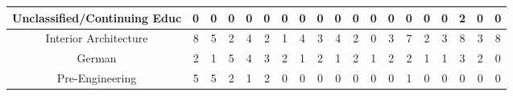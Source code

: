 \documentclass[10pt]{article}
\begin{document}
\begin{landscape}
\begin{longtable}[c]{|ccccccccccccccccccc|}
	\multicolumn{1}{|c|}{Unclassified/Continuing Educ}               & \multicolumn{1}{c|}{0}          & \multicolumn{1}{c|}{0}          & \multicolumn{1}{c|}{0}          & \multicolumn{1}{c|}{0}          & \multicolumn{1}{c|}{0}          & \multicolumn{1}{c|}{0}          & \multicolumn{1}{c|}{0}          & \multicolumn{1}{c|}{0}          & \multicolumn{1}{c|}{0}          & \multicolumn{1}{c|}{0}          & \multicolumn{1}{c|}{0}          & \multicolumn{1}{c|}{0}          & \multicolumn{1}{c|}{0}          & \multicolumn{1}{c|}{0}          & \multicolumn{1}{c|}{0}          & \multicolumn{1}{c|}{2}          & \multicolumn{1}{c|}{0}          & 0          \\ \hline
	\multicolumn{1}{|c|}{Interior Architecture}                      & \multicolumn{1}{c|}{8}          & \multicolumn{1}{c|}{5}          & \multicolumn{1}{c|}{2}          & \multicolumn{1}{c|}{4}          & \multicolumn{1}{c|}{2}          & \multicolumn{1}{c|}{1}          & \multicolumn{1}{c|}{4}          & \multicolumn{1}{c|}{3}          & \multicolumn{1}{c|}{4}          & \multicolumn{1}{c|}{2}          & \multicolumn{1}{c|}{0}          & \multicolumn{1}{c|}{3}          & \multicolumn{1}{c|}{7}          & \multicolumn{1}{c|}{2}          & \multicolumn{1}{c|}{3}          & \multicolumn{1}{c|}{8}          & \multicolumn{1}{c|}{3}          & 8          \\ \hline
	\multicolumn{1}{|c|}{German}                                     & \multicolumn{1}{c|}{2}          & \multicolumn{1}{c|}{1}          & \multicolumn{1}{c|}{5}          & \multicolumn{1}{c|}{4}          & \multicolumn{1}{c|}{3}          & \multicolumn{1}{c|}{2}          & \multicolumn{1}{c|}{1}          & \multicolumn{1}{c|}{2}          & \multicolumn{1}{c|}{1}          & \multicolumn{1}{c|}{2}          & \multicolumn{1}{c|}{1}          & \multicolumn{1}{c|}{2}          & \multicolumn{1}{c|}{2}          & \multicolumn{1}{c|}{1}          & \multicolumn{1}{c|}{1}          & \multicolumn{1}{c|}{3}          & \multicolumn{1}{c|}{2}          & 0          \\ \hline
	\multicolumn{1}{|c|}{Pre-Engineering}                            & \multicolumn{1}{c|}{5}          & \multicolumn{1}{c|}{5}          & \multicolumn{1}{c|}{2}          & \multicolumn{1}{c|}{1}          & \multicolumn{1}{c|}{2}          & \multicolumn{1}{c|}{0}          & \multicolumn{1}{c|}{0}          & \multicolumn{1}{c|}{0}          & \multicolumn{1}{c|}{0}          & \multicolumn{1}{c|}{0}          & \multicolumn{1}{c|}{0}          & \multicolumn{1}{c|}{0}          & \multicolumn{1}{c|}{1}          & \multicolumn{1}{c|}{0}          & \multicolumn{1}{c|}{0}          & \multicolumn{1}{c|}{0}          & \multicolumn{1}{c|}{0}          & 0          \\ \hline

\end{longtable}
\end{landscape}
\end{document}
